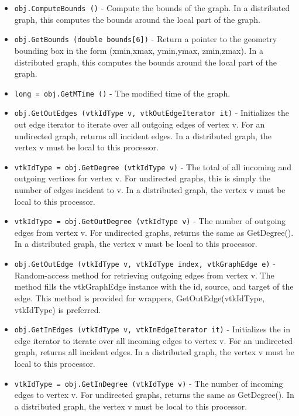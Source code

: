 \begin{itemize}
\item  \verb|obj.ComputeBounds ()| -  Compute the bounds of the graph. In a distributed graph, this
 computes the bounds around the local part of the graph.

\item  \verb|obj.GetBounds (double bounds[6])| -  Return a pointer to the geometry bounding box in the form
 (xmin,xmax, ymin,ymax, zmin,zmax). In a distributed graph, this
 computes the bounds around the local part of the graph.

\item  \verb|long = obj.GetMTime ()| -  The modified time of the graph.

\item  \verb|obj.GetOutEdges (vtkIdType v, vtkOutEdgeIterator it)| -  Initializes the out edge iterator to iterate over
 all outgoing edges of vertex v.  For an undirected graph,
 returns all incident edges. In a distributed graph, the vertex
 v must be local to this processor.

\item  \verb|vtkIdType = obj.GetDegree (vtkIdType v)| -  The total of all incoming and outgoing vertices for vertex v.
 For undirected graphs, this is simply the number of edges incident
 to v. In a distributed graph, the vertex v must be local to this
 processor.

\item  \verb|vtkIdType = obj.GetOutDegree (vtkIdType v)| -  The number of outgoing edges from vertex v.
 For undirected graphs, returns the same as GetDegree(). In a
 distributed graph, the vertex v must be local to this processor.

\item  \verb|obj.GetOutEdge (vtkIdType v, vtkIdType index, vtkGraphEdge e)| -  Random-access method for retrieving outgoing edges from vertex v.
 The method fills the vtkGraphEdge instance with the id, source, and
 target of the edge. This method is provided for wrappers,
 GetOutEdge(vtkIdType, vtkIdType) is preferred.

\item  \verb|obj.GetInEdges (vtkIdType v, vtkInEdgeIterator it)| -  Initializes the in edge iterator to iterate over
 all incoming edges to vertex v.  For an undirected graph,
 returns all incident edges. In a distributed graph, the vertex
 v must be local to this processor.

\item  \verb|vtkIdType = obj.GetInDegree (vtkIdType v)| -  The number of incoming edges to vertex v.
 For undirected graphs, returns the same as GetDegree(). In a
 distributed graph, the vertex v must be local to this processor.


\end{itemize}
